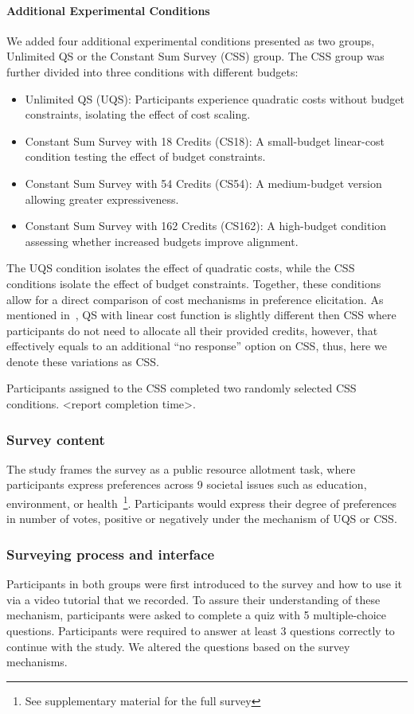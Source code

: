 \paragraph{Additional Experimental Conditions}
We added four additional experimental conditions presented as two groups, Unlimited QS or the Constant Sum Survey (CSS) group. The CSS group was further divided into three conditions with different budgets:

\begin{itemize}
    \item Unlimited QS (UQS): Participants experience quadratic costs without budget constraints, isolating the effect of cost scaling.
    \item Constant Sum Survey with 18 Credits (CS18): A small-budget linear-cost condition testing the effect of budget constraints.
    \item Constant Sum Survey with 54 Credits (CS54): A medium-budget version allowing greater expressiveness.
    \item Constant Sum Survey with 162 Credits (CS162): A high-budget condition assessing whether increased budgets improve alignment.
\end{itemize}

The UQS condition isolates the effect of quadratic costs, while the CSS conditions isolate the effect of budget constraints. Together, these conditions allow for a direct comparison of cost mechanisms in preference elicitation. As mentioned in~, QS with linear cost function is slightly different then CSS where participants do not need to allocate all their provided credits, however, that effectively equals to an additional ``no response'' option on CSS, thus, here we denote these variations as CSS.

Participants assigned to the CSS completed two randomly selected CSS conditions. <report completion time>.

\subsubsection{Survey content}
The study frames the survey as a public resource allotment task, where participants express preferences across 9 societal issues such as education, environment, or health~\footnote{See supplementary material for the full survey}. Participants would express their degree of preferences in number of votes, positive or negatively under the mechanism of UQS or CSS.

\subsubsection{Surveying process and interface}
Participants in both groups were first introduced to the survey and how to use it via a video tutorial that we recorded. To assure their understanding of these mechanism, participants were asked to complete a quiz with 5 multiple-choice questions. Participants were required to answer at least 3 questions correctly to continue with the study. We altered the questions based on the survey mechanisms.

